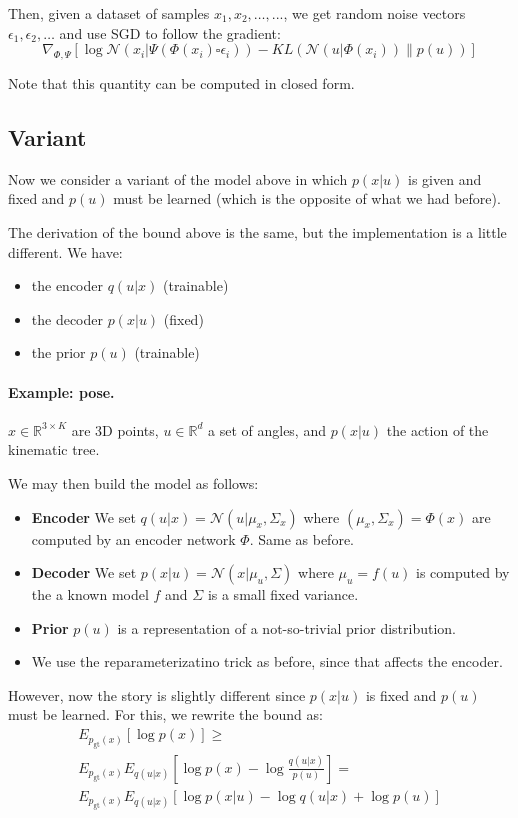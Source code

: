 Then, given a dataset of samples $x_1,x_2,\dots,...$, we get random noise vectors $\epsilon_1,\epsilon_2,\dots$ and use SGD to follow the gradient:
$$
  \nabla_{\Phi,\Psi}
  \left[
    \log \mathcal{N} (x_i| \Psi(\Phi(x_i) \square \epsilon_i))
    - KL(\mathcal{N}(u| \Phi(x_i)) \| p(u))
  \right]
$$

Note that this quantity can be computed in closed form.

\subsection{Variant}

Now we consider a variant of the model above in which $p(x|u)$ is given and fixed and $p(u)$ must be learned (which is the opposite of what we had before).

The derivation of the bound above is the same, but the implementation is a little different. We have:

\begin{itemize}
\item the encoder $q(u|x)$ (trainable)
\item the decoder $p(x|u)$ (fixed)
\item the prior $p(u)$ (trainable)
\end{itemize}

\paragraph{Example: pose.} $x \in\mathbb{R}^{3\times K}$ are 3D points, $u\in\mathbb{R}^d$ a set of angles, and $p(x|u)$ the action of the kinematic tree.

We may then build the model as follows:
\begin{itemize}
\item \textbf{Encoder} We set $q(u|x) = \mathcal{N}(u | \mu_x, \Sigma_x)$ where $(\mu_x,\Sigma_x) = \Phi(x)$ are computed by an encoder network $\Phi$. Same as before.

\item \textbf{Decoder} We set $p(x|u) = \mathcal{N}(x | \mu_u, \Sigma)$ where $\mu_u = f(u)$ is computed by the a known model $f$ and $\Sigma$ is a small fixed variance.

\item \textbf{Prior} $p(u)$ is a representation of a not-so-trivial prior distribution.

\item We use the reparameterizatino trick as before, since that affects the encoder.
\end{itemize}
However, now the story is slightly different since $p(x|u)$ is fixed and $p(u)$ must be learned.
For this, we rewrite the bound as:
\begin{multline}
E_{p_{\text{gt}}(x)}[
  \log p(x)
]
\geq
\\
E_{p_{\text{gt}}(x)}
E_{q(u|x)}\left[
\log p(x)
-
\log \frac{q(u|x)}{p(u)}
\right]
=
\\
E_{p_{\text{gt}}(x)}
E_{q(u|x)}\left[
\log p(x|u)
-
\log q(u|x)
+
\log p(u)
\right]
\end{multline}

